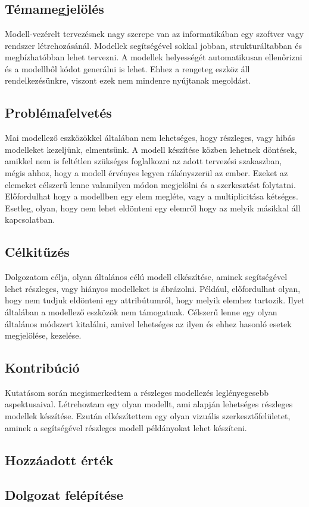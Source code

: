 \chapter{\bevezetes}

\section{Témamegjelölés}
Modell-vezérelt tervezésnek nagy szerepe van az informatikában egy szoftver vagy rendszer létrehozásánál. Modellek segítségével sokkal jobban, strukturáltabban és megbízhatóbban lehet tervezni. A modellek helyességét automatikusan ellenőrizni és a modellből kódot generálni is lehet. Ehhez a rengeteg eszköz áll rendelkezésünkre, viszont ezek nem mindenre nyújtanak megoldást. 
\section{Problémafelvetés}
Mai modellező eszközökkel általában nem lehetséges, hogy részleges, vagy hibás modelleket kezeljünk, elmentsünk. A modell készítése közben lehetnek döntések, amikkel nem is feltétlen szükséges foglalkozni az adott tervezési szakaszban, mégis ahhoz, hogy a modell érvényes legyen rákényszerül az ember. Ezeket az elemeket célszerű lenne valamilyen módon megjelölni és a szerkesztést folytatni. Előfordulhat hogy a modellben egy elem megléte, vagy a multiplicitása kétséges. Esetleg, olyan, hogy nem lehet eldönteni egy elemről hogy az melyik másikkal áll kapcsolatban.
\section{Célkitűzés}	
Dolgozatom célja, olyan általános célú modell elkészítése, aminek segítségével lehet részleges, vagy hiányos modelleket is ábrázolni. Például, előfordulhat olyan, hogy nem tudjuk eldönteni egy attribútumról, hogy melyik elemhez tartozik. Ilyet általában a modellező eszközök nem támogatnak. Célszerű lenne egy olyan általános módszert kitalálni, amivel lehetséges az ilyen és ehhez hasonló esetek megjelölése, kezelése.
\section{Kontribúció}
Kutatásom során megismerkedtem a részleges modellezés leglényegesebb aspektusaival. Létrehoztam egy olyan modellt, ami alapján lehetséges részleges modellek készítése. Ezután elkészítettem egy olyan vizuális szerkesztőfelületet, aminek a segítségével részleges modell példányokat lehet készíteni.  

\section{Hozzáadott érték}	

\section{Dolgozat felépítése}

